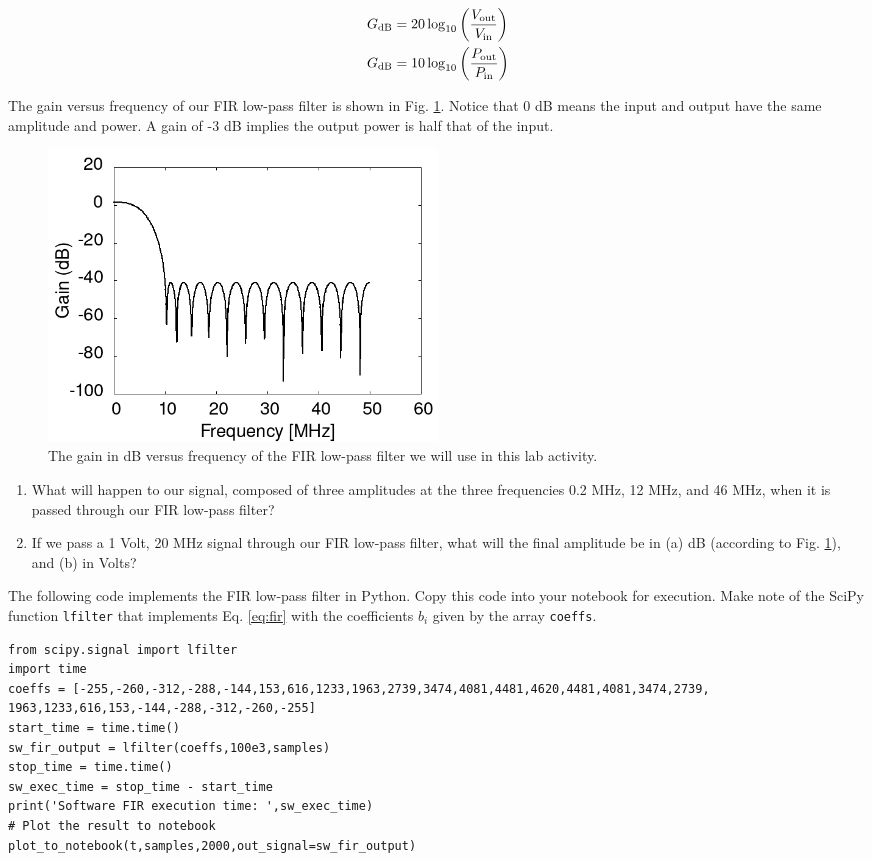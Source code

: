 \documentclass{article}
\begin{document}
\begin{align}
G_{\rm dB} &= 20 \log_{10}\left( \frac{V_{\rm out}}{V_{\rm in}} \right) \\
G_{\rm dB} &= 10 \log_{10}\left( \frac{P_{\rm out}}{P_{\rm in}} \right)
\end{align}

\noindent
The gain versus frequency of our FIR low-pass filter is shown in Fig. \ref{fig:fir}.  Notice that 0 dB means the input and output have the same amplitude and power.  A gain of -3 dB implies the output power is half that of the input.

\begin{figure}[hb]
\centering
\includegraphics[width=0.5\textwidth]{FIR_gain_vs_freq.png}
\caption{\label{fig:fir} The gain in dB versus frequency of the FIR low-pass filter we will use in this lab activity.}
\end{figure}

\begin{enumerate}
\item What will happen to our signal, composed of three amplitudes at the three frequencies 0.2 MHz, 12 MHz, and 46 MHz, when it is passed through our FIR low-pass filter? \\ \vspace{1cm}
\item If we pass a 1 Volt, 20 MHz signal through our FIR low-pass filter, what will the final amplitude be in (a) dB (according to Fig. \ref{fig:fir}), and (b) in Volts? \\ \vspace{1cm}
\end{enumerate}

\noindent
The following code implements the FIR low-pass filter in Python.  Copy this code into your notebook for execution.  Make note of the SciPy function \verb+lfilter+ that implements Eq. \ref{eq:fir} with the coefficients $b_i$ given by the array \verb+coeffs+.

\begin{verbatim}
from scipy.signal import lfilter
import time
coeffs = [-255,-260,-312,-288,-144,153,616,1233,1963,2739,3474,4081,4481,4620,4481,4081,3474,2739,
1963,1233,616,153,-144,-288,-312,-260,-255]
start_time = time.time()
sw_fir_output = lfilter(coeffs,100e3,samples)
stop_time = time.time()
sw_exec_time = stop_time - start_time
print('Software FIR execution time: ',sw_exec_time)
# Plot the result to notebook
plot_to_notebook(t,samples,2000,out_signal=sw_fir_output)
\end{verbatim}
\end{document}
